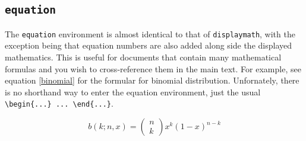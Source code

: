 \subsection{\texttt{equation}}

The \texttt{equation} environment is almost identical to that of
\texttt{displaymath}, with the exception being that equation numbers are
also added along side the displayed mathematics. This is useful for
documents that contain many mathematical formulas and you wish to
cross-reference them in the main text. For example, see equation \ref{binomial} for
the formular for binomial distribution. Unfornately, there is no
shorthand way to enter the equation environment, just the usual
\verb|\begin{...} ... \end{...}|.

\begin{equation}
b\left(k; n, x\right) = \left( \begin{array}{c} n \\ k \end{array}\right) x^k\left(1-x\right)^{n-k}
\label{binomial}
\end{equation}


